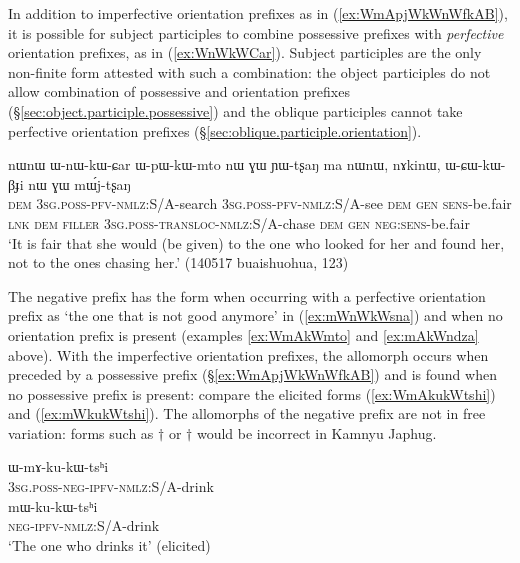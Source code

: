 In addition to imperfective orientation prefixes as in (\ref{ex:WmApjWkWnWfkAB}), it is possible for subject participles to combine possessive prefixes with \textit{perfective} orientation prefixes, as in (\ref{ex:WnWkWCar}). Subject participles are the only non-finite form attested with such a combination: the object participles do not allow combination of possessive and orientation prefixes (§\ref{sec:object.participle.possessive}) and the oblique participles cannot take perfective orientation prefixes (§\ref{sec:oblique.participle.orientation}).

 \begin{exe} 
\ex \label{ex:WnWkWCar}
\gll nɯnɯ ɯ-nɯ-kɯ-ɕar ɯ-pɯ-kɯ-mto nɯ ɣɯ ɲɯ-tʂaŋ ma nɯnɯ, nɤkinɯ, ɯ-ɕɯ-kɯ-βɟi nɯ ɣɯ mɯ́j-tʂaŋ \\
\textsc{dem} \textsc{3sg}.\textsc{poss}-\textsc{pfv}-\textsc{nmlz}:S/A-search \textsc{3sg}.\textsc{poss}-\textsc{pfv}-\textsc{nmlz}:S/A-see \textsc{dem} \textsc{gen} \textsc{sens}-be.fair \textsc{lnk} \textsc{dem} \textsc{filler} \textsc{3sg}.\textsc{poss}-\textsc{transloc}-\textsc{nmlz}:S/A-chase \textsc{dem} \textsc{gen} \textsc{neg}:\textsc{sens}-be.fair \\
\glt `It is fair that she would (be given) to the one who looked for her and found her, not to the ones chasing her.' (140517 buaishuohua, 123)
\end{exe}

The negative prefix has the form  when occurring with a perfective orientation prefix as  `the one that is not good anymore' in (\ref{ex:mWnWkWsna}) and  when no orientation prefix is present (examples \ref{ex:WmAkWmto} and \ref{ex:mAkWndza} above). With the imperfective orientation prefixes, the allomorph  occurs when preceded by a possessive prefix (§\ref{ex:WmApjWkWnWfkAB}) and  is found when no possessive prefix is present: compare the elicited forms (\ref{ex:WmAkukWtshi}) and (\ref{ex:mWkukWtshi}). The allomorphs of the negative prefix are not in free variation: forms such as $\dagger$ or $\dagger$ would be incorrect in Kamnyu Japhug.

 \begin{exe} 
\ex \label{ex:WmAkukWtshi}
\gll ɯ-mɤ-ku-kɯ-tsʰi \\
\textsc{3sg}.\textsc{poss}-\textsc{neg}-\textsc{ipfv}-\textsc{nmlz}:S/A-drink \\
\ex \label{ex:mWkukWtshi}
\gll mɯ-ku-kɯ-tsʰi \\
\textsc{neg}-\textsc{ipfv}-\textsc{nmlz}:S/A-drink \\
\glt  `The one who drinks it' (elicited)
\end{exe}

